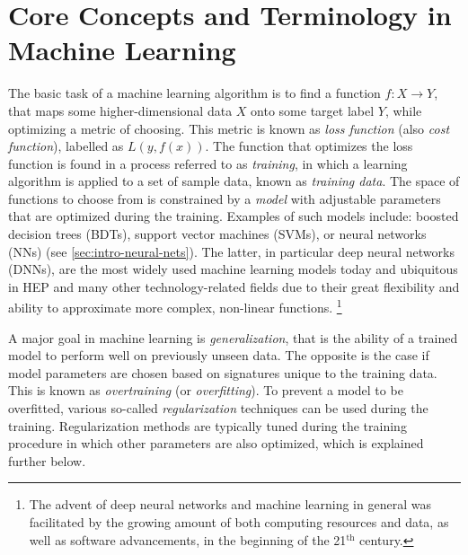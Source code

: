 \section{Core Concepts and Terminology in Machine Learning}
The basic task of a machine learning algorithm is to find a function $f: X \rightarrow Y$, that maps some higher-dimensional data $X$ onto some target label $Y$, while optimizing a metric of choosing.
This metric is known as \emph{loss function} (also \emph{cost function}), labelled as $L(y, f(x))$.
The function that optimizes the loss function is found in a process referred to as \emph{training}, in which a learning algorithm is applied to a set of sample data, known as \emph{training data}.
The space of functions to choose from is constrained by a \emph{model} with adjustable parameters that are optimized during the training. Examples of such models include: boosted decision trees (BDTs), support vector machines (SVMs), or neural networks (NNs) (see \cref{sec:intro-neural-nets}). The latter, in particular deep neural networks (DNNs), are the most widely used machine learning models today and ubiquitous in HEP and many other technology-related fields due to their great flexibility and ability to approximate more complex, non-linear functions.  \footnote{The advent of deep neural networks and machine learning in general was facilitated by the growing amount of both computing resources and data, as well as software advancements, in the beginning of the 21$^{\text{th}}$ century.}



A major goal in machine learning is \emph{generalization}, that is the ability of a trained model to perform well on previously unseen data.
The opposite is the case if model parameters are chosen based on signatures unique to the training data. This is known as \emph{overtraining} (or \emph{overfitting}). To prevent a model to be overfitted, various so-called \emph{regularization} techniques can be used during the training.
Regularization methods are typically tuned during the training procedure in which other parameters are also optimized, which is explained further below.


